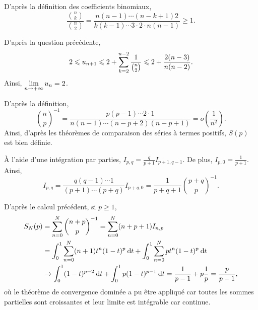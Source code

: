 \documentclass[oneside,11pt]{book}
\begin{document}
\begin{solution}
\qu

\qu D'après la définition des coefficients binomiaux,
\[
\frac{\binom{n}{k}}{\binom{n}{2}} = \frac{n (n-1) \cdots (n-k+1) 2}{k (k-1) \cdots 3 \cdot 2 \cdot n (n-1)} \geq 1.
\]

\qu D'après la question précédente,
\[
2 \leqslant u_{n+1} \leqslant 2 + \sum\limits_{k=2}^{n-2} \frac{1}{\binom{n}{2}} \leqslant 2 + \frac{2(n-3)}{n (n-2)}.
\]
Ainsi, $\lim\limits_{n\to+\infty} u_n = 2$.

\qu D'après la définition,
\[
\binom{n}{p}^{-1} = \frac{p (p-1) \cdots 2 \cdot 1}{n (n-1) \cdots (n-p+2) (n-p+1)} = o\left(\frac{1}{n^2}\right).
\]
Ainsi, d'après les théorèmes de comparaison des séries à termes positifs, $S(p)$ est bien définie.

\qu À l'aide d'une intégration par parties, $I_{p,q} = \frac{q}{p+1} I_{p+1,q-1}$. De plus, $I_{p,0} = \frac{1}{p+1}$. Ainsi,
\[
I_{p,q} = \frac{q (q-1) \cdots 1}{(p+1) \cdots (p+q)} I_{p+q,0} = \frac{1}{p+q+1} \binom{p+q}{p}^{-1}.
\]

\qu D'après le calcul précédent, si $p \geq 1$,
\begin{align*}
S_N(p) &= \sum\limits_{n=0}^{N} \binom{n+p}{p}^{-1} = \sum\limits_{n=0}^{N} (n+p+1) I_{n,p} \\
&= \displaystyle \int_0^1 \sum\limits_{n=0}^N (n+1) t^n (1 -t)^p \:{\text d}t + \displaystyle \int_0^1 \sum\limits_{n=0}^N p t^n (1 - t)^p \:{\text d}t \\
&\to \displaystyle \int_0^1 (1 -t)^{p-2} \:{\text d}t + \displaystyle \int_0^1 p (1 - t)^{p-1} \:{\text d}t 
= \frac{1}{p-1} + p \frac{1}{p} = \frac{p}{p-1},
\end{align*}
où le théorème de convergence dominée a pu être appliqué car toutes les sommes partielles sont croissantes et leur limite est intégrable car continue.

\end{solution}
\end{document}
